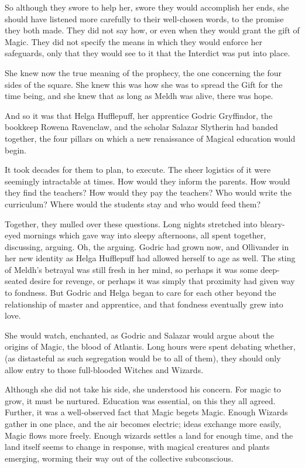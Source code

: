 So although they swore to help her, swore they would accomplish her ends, she should have listened more carefully to their well-chosen words, to the promise they both made. They did not say how, or even when they would grant the gift of Magic. They did not specify the means in which they would enforce her safeguards, only that they would see to it that the Interdict was put into place.

She knew now the true meaning of the prophecy, the one concerning the four sides of the square. She knew this was how she was to spread the Gift for the time being, and she knew that as long as Meldh was alive, there was hope.

And so it was that Helga Hufflepuff, her apprentice Godric Gryffindor, the bookkeep Rowena Ravenclaw, and the scholar Salazar Slytherin had banded together, the four pillars on which a new renaissance of Magical education would begin.

It took decades for them to plan, to execute. The sheer logistics of it were seemingly intractable at times. How would they inform the parents. How would they find the teachers? How would they pay the teachers? Who would write the curriculum? Where would the students stay and who would feed them?

Together, they mulled over these questions. Long nights stretched into bleary-eyed mornings which gave way into sleepy afternoons, all spent together, discussing, arguing. Oh, the arguing. Godric had grown now, and Ollivander in her new identity as Helga Hufflepuff had allowed herself to age as well. The sting of Meldh’s betrayal was still fresh in her mind, so perhaps it was some deep-seated desire for revenge, or perhaps it was simply that proximity had given way to fondness. But Godric and Helga began to care for each other beyond the relationship of master and apprentice, and that fondness eventually grew into love.

She would watch, enchanted, as Godric and Salazar would argue about the origins of Magic, the blood of Atlantis. Long hours were spent debating whether, (as distasteful as such segregation would be to all of them), they should only allow entry to those full-blooded Witches and Wizards.

Although she did not take his side, she understood his concern. For magic to grow, it must be nurtured. Education was essential, on this they all agreed. Further, it was a well-observed fact that Magic begets Magic. Enough Wizards gather in one place, and the air becomes electric; ideas exchange more easily, Magic flows more freely. Enough wizards settles a land for enough time, and the land itself seems to change in response, with magical creatures and plants emerging, worming their way out of the collective subconscious.

